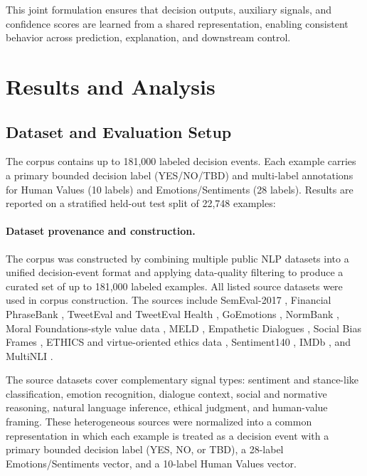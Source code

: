 \documentclass[11pt]{article}
\begin{document}
This joint formulation ensures that decision outputs, auxiliary signals, and confidence scores are
learned from a shared representation, enabling consistent behavior across prediction, explanation,
and downstream control.

\section{Results and Analysis}

\subsection{Dataset and Evaluation Setup}

The corpus contains up to 181,000 labeled decision events. Each example carries a primary bounded
decision label (YES/NO/TBD) and multi-label annotations for Human Values (10 labels) and
Emotions/Sentiments (28 labels). Results are reported on a stratified held-out test split of 22,748
examples:

\paragraph{Dataset provenance and construction.}
The corpus was constructed by combining multiple public NLP datasets into a unified decision-event
format and applying data-quality filtering to produce a curated set of up to 181,000 labeled
examples. All listed source datasets were used in corpus construction. The sources include
SemEval-2017 \cite{rosenthal2017semeval}, Financial PhraseBank \cite{malo2014good},
TweetEval and TweetEval Health \cite{barbieri2020tweeteval}, GoEmotions
\cite{demszky2020goemotions}, NormBank \cite{ziems2023normbank},
Moral Foundations-style value data \cite{hoover2020mftc}, MELD \cite{poria2019meld},
Empathetic Dialogues \cite{rashkin2019empathetic}, Social Bias Frames
\cite{sap2020socialbias}, ETHICS and virtue-oriented ethics data
\cite{hendrycks2021ethics}, Sentiment140 \cite{go2009twitter}, IMDb
\cite{maas2011learning}, and MultiNLI \cite{williams2018broad}.

The source datasets cover complementary signal types: sentiment and stance-like classification,
emotion recognition, dialogue context, social and normative reasoning, natural language inference,
ethical judgment, and human-value framing. These heterogeneous sources were normalized into a
common representation in which each example is treated as a decision event with a primary bounded
decision label (YES, NO, or TBD), a 28-label Emotions/Sentiments vector, and a 10-label Human
Values vector.
\end{document}
